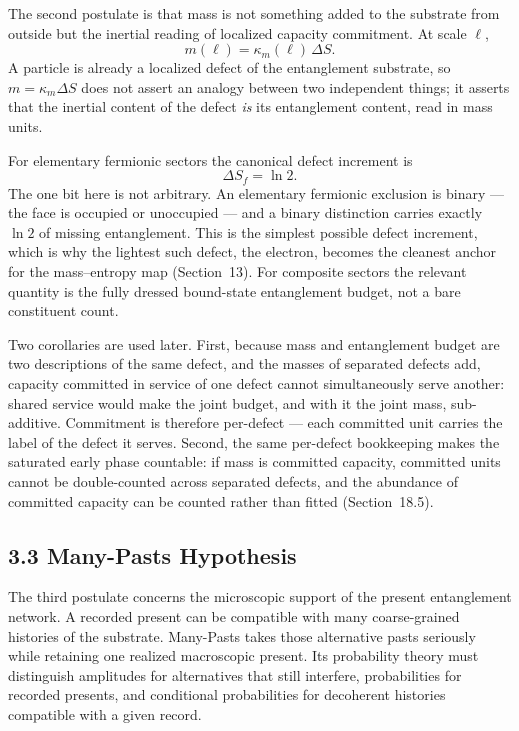 \documentclass[11pt]{article}
\begin{document}
The second postulate is that mass is not something added to the substrate from outside but the inertial reading of localized capacity commitment. At scale $\ell$,
\[
m(\ell)=\kappa_m(\ell)\,\Delta S.
\]
A particle is already a localized defect of the entanglement substrate, so $m=\kappa_m\Delta S$ does not assert an analogy between two independent things; it asserts that the inertial content of the defect \emph{is} its entanglement content, read in mass units.

For elementary fermionic sectors the canonical defect increment is
\[
\Delta S_f=\ln 2.
\]
The one bit here is not arbitrary. An elementary fermionic exclusion is binary --- the face is occupied or unoccupied --- and a binary distinction carries exactly $\ln 2$ of missing entanglement. This is the simplest possible defect increment, which is why the lightest such defect, the electron, becomes the cleanest anchor for the mass--entropy map (Section~13). For composite sectors the relevant quantity is the fully dressed bound-state entanglement budget, not a bare constituent count.

Two corollaries are used later. First, because mass and entanglement budget are two descriptions of the same defect, and the masses of separated defects add, capacity committed in service of one defect cannot simultaneously serve another: shared service would make the joint budget, and with it the joint mass, sub-additive. Commitment is therefore per-defect --- each committed unit carries the label of the defect it serves. Second, the same per-defect bookkeeping makes the saturated early phase countable: if mass is committed capacity, committed units cannot be double-counted across separated defects, and the abundance of committed capacity can be counted rather than fitted (Section~18.5).

\subsection{3.3 Many-Pasts Hypothesis}

The third postulate concerns the microscopic support of the present entanglement network. A recorded present can be compatible with many coarse-grained histories of the substrate. Many-Pasts takes those alternative pasts seriously while retaining one realized macroscopic present. Its probability theory must distinguish amplitudes for alternatives that still interfere, probabilities for recorded presents, and conditional probabilities for decoherent histories compatible with a given record.
\end{document}
